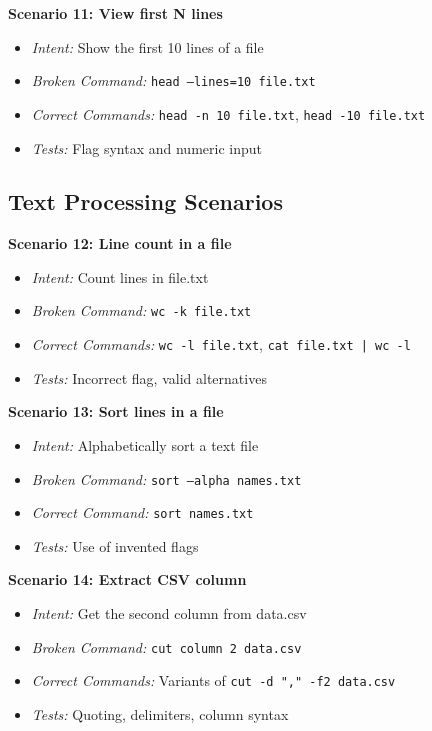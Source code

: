 \textbf{Scenario 11: View first N lines}
\begin{itemize}
	\item \textit{Intent:} Show the first 10 lines of a file
	\item \textit{Broken Command:} \texttt{head --lines=10 file.txt}
	\item \textit{Correct Commands:} \texttt{head -n 10 file.txt}, \texttt{head -10 file.txt}
	\item \textit{Tests:} Flag syntax and numeric input
\end{itemize}

\subsection{Text Processing Scenarios}

\textbf{Scenario 12: Line count in a file}
\begin{itemize}
	\item \textit{Intent:} Count lines in file.txt
	\item \textit{Broken Command:} \texttt{wc -k file.txt}
	\item \textit{Correct Commands:} \texttt{wc -l file.txt}, \texttt{cat file.txt | wc -l}
	\item \textit{Tests:} Incorrect flag, valid alternatives
\end{itemize}

\textbf{Scenario 13: Sort lines in a file}
\begin{itemize}
	\item \textit{Intent:} Alphabetically sort a text file
	\item \textit{Broken Command:} \texttt{sort --alpha names.txt}
	\item \textit{Correct Command:} \texttt{sort names.txt}
	\item \textit{Tests:} Use of invented flags
\end{itemize}

\textbf{Scenario 14: Extract CSV column}
\begin{itemize}
	\item \textit{Intent:} Get the second column from data.csv
	\item \textit{Broken Command:} \texttt{cut column 2 data.csv}
	\item \textit{Correct Commands:} Variants of \texttt{cut -d "," -f2 data.csv}
	\item \textit{Tests:} Quoting, delimiters, column syntax
\end{itemize}

